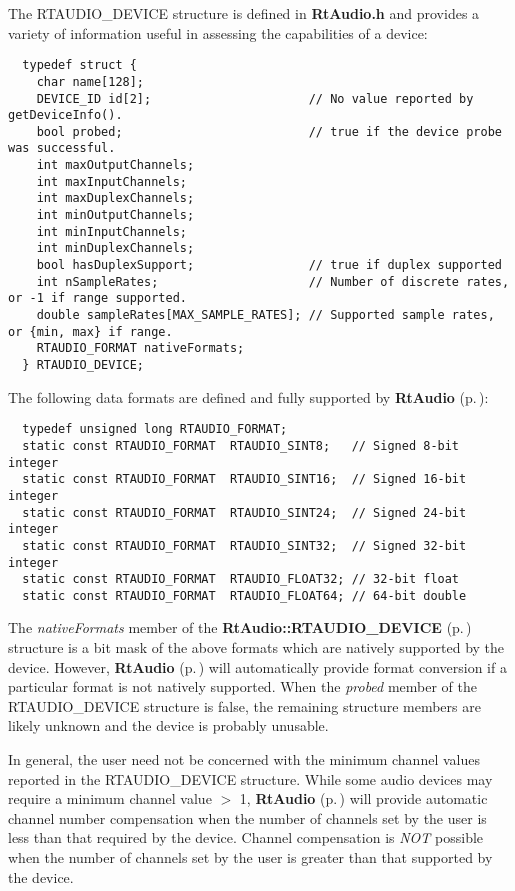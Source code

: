 The RTAUDIO\_\-DEVICE structure is defined in {\bf Rt\-Audio.h} and provides a variety of information useful in assessing the capabilities of a device:

\footnotesize\begin{verbatim}  typedef struct {
    char name[128];
    DEVICE_ID id[2];                      // No value reported by getDeviceInfo().
    bool probed;                          // true if the device probe was successful.
    int maxOutputChannels;
    int maxInputChannels;
    int maxDuplexChannels;
    int minOutputChannels;
    int minInputChannels;
    int minDuplexChannels;
    bool hasDuplexSupport;                // true if duplex supported
    int nSampleRates;                     // Number of discrete rates, or -1 if range supported.
    double sampleRates[MAX_SAMPLE_RATES]; // Supported sample rates, or {min, max} if range.
    RTAUDIO_FORMAT nativeFormats;
  } RTAUDIO_DEVICE;\end{verbatim}\normalsize 


The following data formats are defined and fully supported by {\bf Rt\-Audio} {\rm (p.\,\pageref{classRtAudio})}:

\footnotesize\begin{verbatim}  typedef unsigned long RTAUDIO_FORMAT;
  static const RTAUDIO_FORMAT  RTAUDIO_SINT8;   // Signed 8-bit integer
  static const RTAUDIO_FORMAT  RTAUDIO_SINT16;  // Signed 16-bit integer
  static const RTAUDIO_FORMAT  RTAUDIO_SINT24;  // Signed 24-bit integer
  static const RTAUDIO_FORMAT  RTAUDIO_SINT32;  // Signed 32-bit integer
  static const RTAUDIO_FORMAT  RTAUDIO_FLOAT32; // 32-bit float
  static const RTAUDIO_FORMAT  RTAUDIO_FLOAT64; // 64-bit double\end{verbatim}\normalsize 


The {\em native\-Formats} member of the {\bf Rt\-Audio::RTAUDIO\_\-DEVICE} {\rm (p.\,\pageref{structRtAudio_1_1RTAUDIO__DEVICE})} structure is a bit mask of the above formats which are natively supported by the device. However, {\bf Rt\-Audio} {\rm (p.\,\pageref{classRtAudio})} will automatically provide format conversion if a particular format is not natively supported. When the {\em probed} member of the RTAUDIO\_\-DEVICE structure is false, the remaining structure members are likely unknown and the device is probably unusable.

In general, the user need not be concerned with the minimum channel values reported in the RTAUDIO\_\-DEVICE structure. While some audio devices may require a minimum channel value $>$ 1, {\bf Rt\-Audio} {\rm (p.\,\pageref{classRtAudio})} will provide automatic channel number compensation when the number of channels set by the user is less than that required by the device. Channel compensation is {\em NOT} possible when the number of channels set by the user is greater than that supported by the device.

